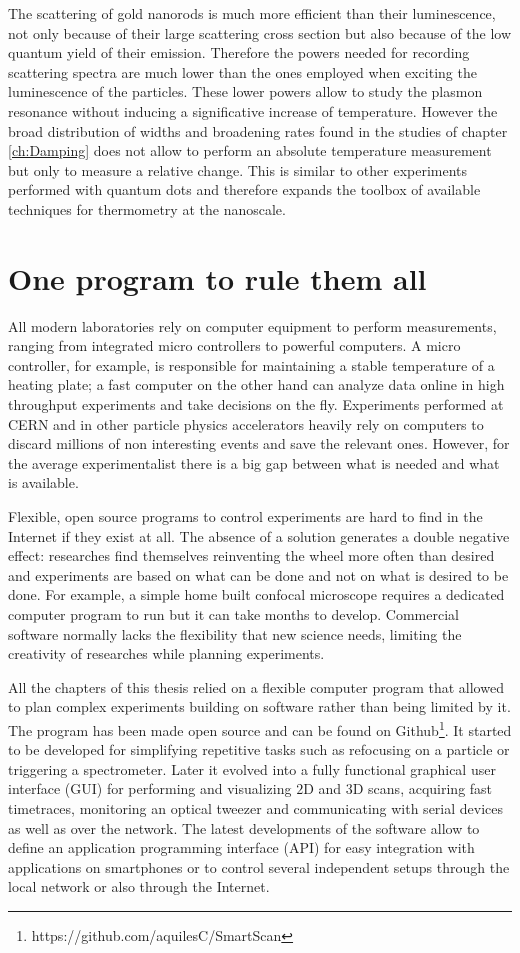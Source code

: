 The scattering of gold nanorods is much more efficient than their luminescence,
not only because of their large scattering cross section but also because of the
low quantum yield of their emission. Therefore the powers needed for recording
scattering spectra are much lower than the ones employed when exciting the
luminescence of the particles. These lower powers allow to study the plasmon
resonance without inducing a significative increase of temperature. However the
broad distribution of widths and broadening rates found in the studies of
chapter \ref{ch:Damping} does not allow to perform an absolute temperature
measurement but only to measure a relative change. This is similar to other
experiments performed with quantum dots\cite{Yang2011a} and therefore expands
the toolbox of available techniques for thermometry at the nanoscale.

\section{One program to rule them all}
All modern laboratories rely on computer equipment to perform measurements,
ranging from integrated micro controllers to powerful computers. A micro
controller, for example, is responsible for maintaining a stable temperature of
a heating plate; a fast computer on the other hand can analyze data online in high
throughput experiments and take decisions on the fly. Experiments performed at
CERN and in other particle physics accelerators heavily rely on computers to
discard millions of non interesting events and save the relevant ones. However, 
for the average experimentalist there is a big gap between what is needed and
what is available.

Flexible, open source programs to control experiments are hard to find in the
Internet if they exist at all. The absence of a solution generates a double
negative effect: researches find themselves reinventing the wheel more often
than desired and experiments are based on what can be done and not on what is
desired to be done. For example, a simple home built confocal microscope
requires a dedicated computer program to run but it can take months to develop.
Commercial software normally lacks the flexibility that new science needs,
limiting the creativity of researches while planning experiments.

All the chapters of this thesis relied on a flexible computer program that
allowed to plan complex experiments building on software rather than being
limited by it. The program has been made open source and can be found on
Github\footnote{https://github.com/aquilesC/SmartScan}. It started to be
developed for simplifying repetitive tasks such as refocusing on a particle or
triggering a spectrometer. Later it evolved into a fully functional graphical
user interface (GUI) for performing and visualizing $2$D and $3$D scans,
acquiring fast timetraces, monitoring an optical tweezer and communicating with
serial devices as well as over the network. The latest developments of the
software allow to define an application programming interface (API) for easy
integration with applications on smartphones or to control several independent
setups through the local network or also through the Internet.

